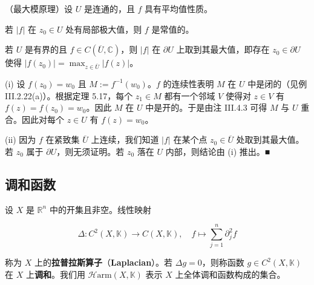 \begin{corollary}

（最大模原理）设 $ U $ 是连通的，且 $ f $ 具有平均值性质。

\begin{subitems}
\item

若 $ |f| $ 在 $ z_{0} \in U $ 处有局部极大值，则 $ f $ 是常值的。

\item

若 $ U $ 是有界的且 $ f \in C(\overline{U},\mathbb{C}) $，则 $ |f| $ 在 $ \partial U $ 上取到其最大值，即存在 $ z_{0} \in \partial U $ 使得 $ |f(z_{0})| = \max_{z\in\overline{U}}|f(z)| $。

\proofhead
(i) 设 $ f(z_{0}) = w_{0} $ 且 $ M := f^{-1}(w_{0}) $。$ f $ 的连续性表明 $ M $ 在 $ U $ 中是闭的（见例 III.2.22(a)）。根据定理 5.17，每个 $ z_{1} \in M $ 都有一个邻域 $ V $ 使得对 $ z \in V $ 有 $ f(z) = f(z_{0}) = w_{0} $。因此 $ M $ 在 $ U $ 中是开的。于是由注 III.4.3 可得 $ M $ 与 $ U $ 重合。因此对每个 $ z \in U $ 有 $ f(z) = w_{0} $。
\end{subitems}

(ii) 因为 $ f $ 在紧致集 $ \overline{U} $ 上连续，我们知道 $ |f| $ 在某个点 $ z_{0} \in \overline{U} $ 处取到其最大值。若 $ z_{0} $ 属于 $ \partial U $，则无须证明。若 $ z_{0} $ 落在 $ U $ 内部，则结论由 (i) 推出。\nobreak\hspace{0.35em}■

\end{corollary}

\subsection*{调和函数}

设 $ X $ 是 $ \mathbb{R}^{n} $ 中的开集且非空。线性映射

\[
\Delta : C^{2}(X,\mathbb{K}) \to C(X,\mathbb{K}) , \quad f \mapsto \sum_{j=1}^{n}\partial_{j}^{2}f
\]

称为 $ X $ 上的\textbf{拉普拉斯算子}（\textbf{Laplacian}）。若 $ \Delta g = 0 $，则称函数 $ g \in C^{2}(X,\mathbb{K}) $ 在 $ X $ 上\textbf{调和}。我们用 $ \mathcal{H}\mathrm{arm}(X,\mathbb{K}) $ 表示 $ X $ 上全体调和函数构成的集合。

